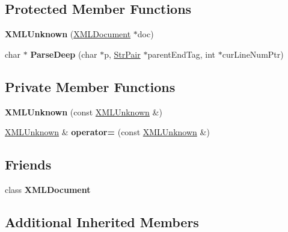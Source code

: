 \subsection*{Protected Member Functions}
\begin{DoxyCompactItemize}
\item 
\mbox{\label{classtinyxml2_1_1XMLUnknown_a9391eb679598d50baba424e6f1aa367b}} 
{\bfseries X\+M\+L\+Unknown} (\mbox{\hyperlink{classtinyxml2_1_1XMLDocument}{X\+M\+L\+Document}} $\ast$doc)
\item 
\mbox{\label{classtinyxml2_1_1XMLUnknown_a105fc419c67018bf57927b2eaf842ec5}} 
char $\ast$ {\bfseries Parse\+Deep} (char $\ast$p, \mbox{\hyperlink{classtinyxml2_1_1StrPair}{Str\+Pair}} $\ast$parent\+End\+Tag, int $\ast$cur\+Line\+Num\+Ptr)
\end{DoxyCompactItemize}
\subsection*{Private Member Functions}
\begin{DoxyCompactItemize}
\item 
\mbox{\label{classtinyxml2_1_1XMLUnknown_aab31a93c95a7cedc9597cea7caffa73f}} 
{\bfseries X\+M\+L\+Unknown} (const \mbox{\hyperlink{classtinyxml2_1_1XMLUnknown}{X\+M\+L\+Unknown}} \&)
\item 
\mbox{\label{classtinyxml2_1_1XMLUnknown_a6137d5611db42c35de3d869f66555e5b}} 
\mbox{\hyperlink{classtinyxml2_1_1XMLUnknown}{X\+M\+L\+Unknown}} \& {\bfseries operator=} (const \mbox{\hyperlink{classtinyxml2_1_1XMLUnknown}{X\+M\+L\+Unknown}} \&)
\end{DoxyCompactItemize}
\subsection*{Friends}
\begin{DoxyCompactItemize}
\item 
\mbox{\label{classtinyxml2_1_1XMLUnknown_a4eee3bda60c60a30e4e8cd4ea91c4c6e}} 
class {\bfseries X\+M\+L\+Document}
\end{DoxyCompactItemize}
\subsection*{Additional Inherited Members}


